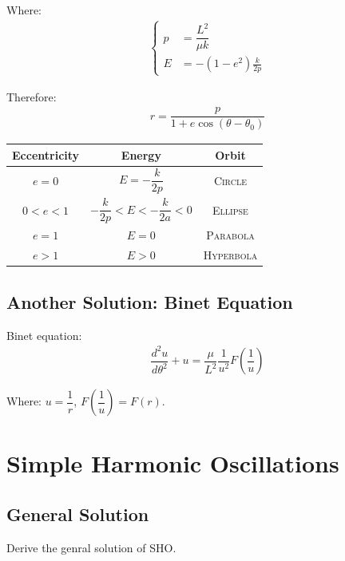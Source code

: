 \documentclass[11pt, a4paper, oneside]{book}
\numberwithin{equation}{section}%
\begin{document}
Where:
\begin{align}
	\left\{
	\begin{aligned}
	p &= \dfrac{L^2}{\mu k}\\
	E &= -(1 - e^2)\frac{k}{2p}
	\end{aligned}
	\right.
\end{align}

Therefore:
\begin{align}
	r = \dfrac{p}{1 + e\cos(\theta - \theta_0)}
\end{align}

\begin{center}
	\begin{tabular}{|c|c|c|}
		\hline
		Eccentricity & Energy & Orbit \\
		\hline
		$e = 0$ & $E = -\dfrac{k}{2p}$ & \textsc{Circle} \\
		\hline $0<e<1$
		& $-\dfrac{k}{2p} < E < -\dfrac{k}{2a} < 0$ & \textsc{Ellipse} \\
		\hline $e=1$
		& $E = 0$ & \textsc{Parabola} \\
		\hline $e>1$
		& $E > 0$ & \textsc{Hyperbola} \\
		\hline
	\end{tabular}
\end{center}

\subsection{Another Solution: Binet Equation}

Binet equation:
\begin{align}
	\dfrac{d^2u}{d\theta^2} + u = \dfrac{\mu}{L^2}\dfrac{1}{u^2}F\left(\dfrac{1}{u}\right)
\end{align}

Where: $u = \dfrac{1}{r}$, $F\left(\dfrac{1}{u}\right) = F(r)$.


\section{Simple Harmonic Oscillations}

\subsection{General Solution}
Derive the genral solution of SHO.
\end{document}
